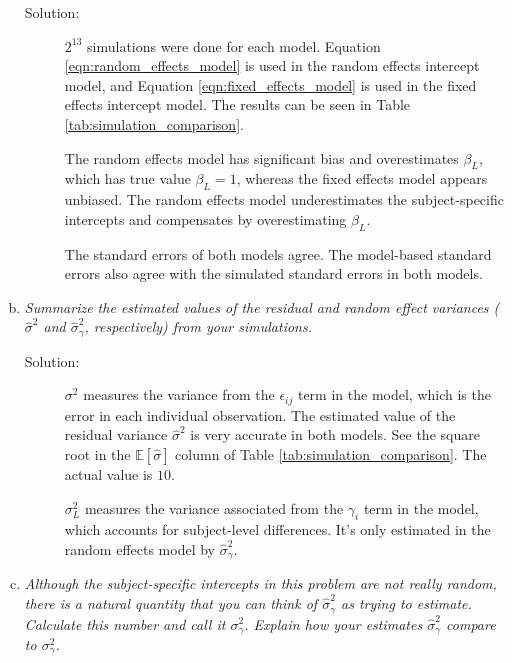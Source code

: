 \documentclass[11pt, letterpaper]{article}
\begin{document}
\begin{enumerate}[(a)]
  

  \begin{description}
  \item[Solution:] $2^{13}$ simulations were done for each model. Equation
    \ref{eqn:random_effects_model} is used in the random effects intercept
    model, and Equation \ref{eqn:fixed_effects_model} is used in the fixed
    effects intercept model. The results can be seen in Table
    \ref{tab:simulation_comparison}.

    The random effects model has significant bias and overestimates $\beta_L$,
    which has true value $\beta_L = 1$, whereas the fixed effects model appears
    unbiased. The random effects model underestimates the subject-specific
    intercepts and compensates by overestimating $\beta_L$.

    The standard errors of both models agree. The model-based standard errors
    also agree with the simulated standard errors in both models.   
  \end{description}
  

\item {\em  Summarize the estimated values of the residual and random effect variances ($\hat{\sigma}^2$ and $\hat{\sigma}^2_\gamma$, respectively) from your simulations.}

  \begin{description}
  \item[Solution:] $\sigma^2$ measures the variance from the $\epsilon_{ij}$
    term in the model, which is the error in each individual observation. The
    estimated value of the residual variance $\hat{\sigma}^2$ is very accurate
    in both models. See the square root in the
    $\mathbb{E}\left[\hat{\sigma}\right]$ column of
    Table \ref{tab:simulation_comparison}. The actual value is $10$.

    $\sigma^2_L$ measures the variance associated from the $\gamma_i$ term in
    the model, which accounts for subject-level differences. It's only estimated
    in the random effects model by $\hat{\sigma}^2_\gamma$.
  \end{description}
  
\item {\em  Although the subject-specific intercepts in this problem are not really random, there is a natural quantity that you can think of $\hat{\sigma}^2_\gamma$ as trying to estimate.  Calculate this number and call
    it $\sigma_\gamma^2$.  Explain how your estimates $\hat{\sigma}^2_\gamma$ compare to  $\sigma_\gamma^2$.}


\end{enumerate}
\end{document}
